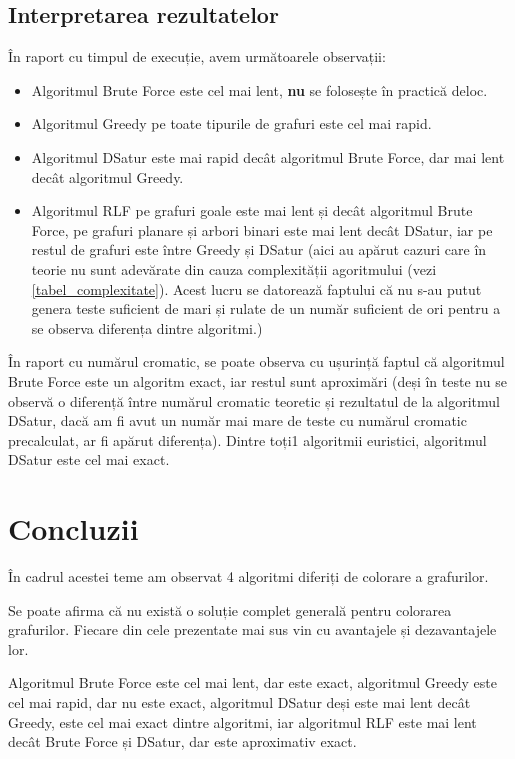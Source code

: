 \documentclass[runningheads]{paper}
\begin{document}
\subsection{Interpretarea rezultatelor}
În raport cu timpul de execuție, avem următoarele observații:
\begin{itemize}
    \item Algoritmul Brute Force este cel mai lent, \textbf{nu} se folosește
    în practică deloc.
    \item Algoritmul Greedy pe toate tipurile de grafuri este cel mai rapid.
    \item Algoritmul DSatur este mai rapid decât algoritmul Brute Force, dar
    mai lent decât algoritmul Greedy.
    \item Algoritmul RLF pe grafuri goale este mai lent și decât algoritmul
    Brute Force, pe grafuri planare și arbori binari este mai lent decât DSatur, 
    iar pe restul de grafuri este între Greedy și DSatur (aici au apărut cazuri
    care în teorie nu sunt adevărate din cauza complexității agoritmului (vezi \ref{tabel_complexitate}).
    Acest lucru se datorează faptului că nu s-au putut genera teste suficient de
    mari și rulate de un număr suficient de ori pentru a se observa diferența dintre algoritmi.)

\end{itemize}

În raport cu numărul cromatic, se poate observa cu ușurință faptul că algoritmul
Brute Force este un algoritm exact, iar restul sunt aproximări (deși în teste 
nu se observă o diferență între numărul cromatic teoretic și rezultatul de la algoritmul DSatur, dacă
am fi avut un număr mai mare de teste cu numărul cromatic precalculat, ar fi apărut diferența).
Dintre toți1 algoritmii euristici, algoritmul DSatur este cel mai exact.

\section{Concluzii}
În cadrul acestei teme am observat 4 algoritmi diferiți de colorare a grafurilor.

Se poate afirma că nu există o soluție complet generală pentru colorarea grafurilor.
Fiecare din cele prezentate mai sus vin cu avantajele și dezavantajele lor.

Algoritmul Brute Force este cel mai lent, dar este exact, algoritmul Greedy este
cel mai rapid, dar nu este exact, algoritmul DSatur deși este mai lent decât Greedy,
este cel mai exact dintre algoritmi, iar algoritmul RLF este mai lent decât Brute Force și 
DSatur, dar este aproximativ exact.
\end{document}
